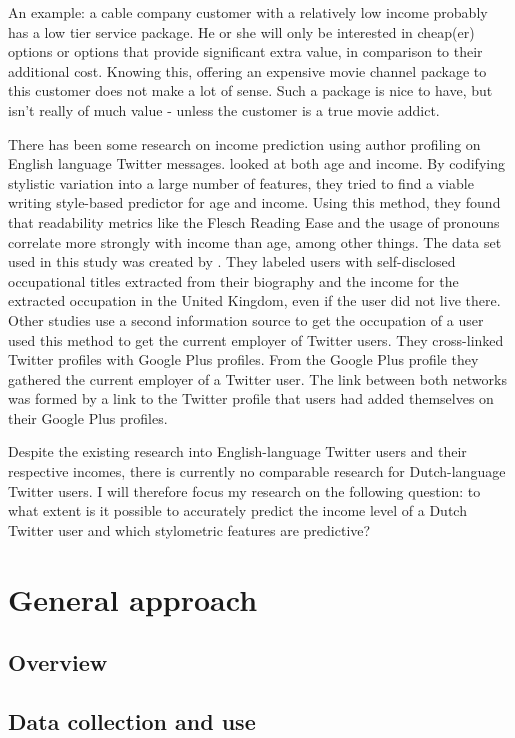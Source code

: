 \documentclass[11pt, a4paper]{article}
\begin{document}
An example: a cable company customer with a relatively low income probably has a low tier service package. He or she will only be interested in cheap(er) options or options that provide significant extra value, in comparison to their additional cost. Knowing this, offering an expensive movie channel package to this customer does not make a lot of sense. Such a package is nice to have, but isn't really of much value - unless the customer is a true movie addict.

There has been some research on income prediction using author profiling on English language Twitter messages. \citet{flekova} looked at both age and income. By codifying stylistic variation into a large number of features, they tried to find a viable writing style-based predictor for age and income. Using this method, they found that readability metrics like the Flesch Reading Ease and the usage of pronouns correlate more strongly with income than age, among other things. The data set used in this study was created by \citet{pietro}. They labeled users with self-disclosed occupational titles extracted from their biography and the income for the extracted occupation in the United Kingdom, even if the user did not live there. Other studies use a second information source to get the occupation of a user  \citet{li} used this method to get the current employer of Twitter users. They cross-linked Twitter profiles with Google Plus profiles. From the Google Plus profile they gathered the current employer of a Twitter user. The link between both networks was formed by a link to the Twitter profile that users had added themselves on their Google Plus profiles.

Despite the existing research into English-language Twitter users and their respective incomes, there is currently no comparable research for Dutch-language Twitter users. I will therefore focus my research on the following question: to what extent is it possible to accurately predict the income level of a Dutch Twitter user and which stylometric features are predictive?

\section{General approach}
\subsection{Overview}

\subsection{Data collection and use}
\end{document}
